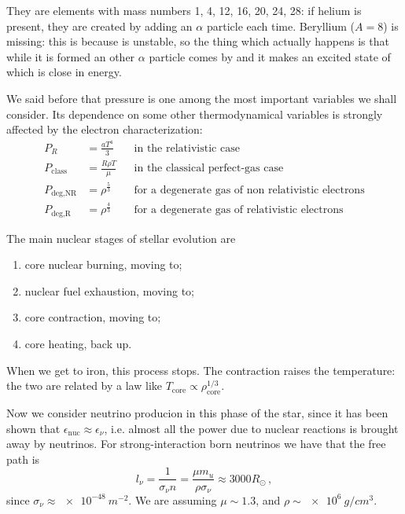 \documentclass[main.tex]{subfiles}
\begin{document}
\begin{bluebox}
They are elements with mass numbers 1, 4, 12, 16, 20, 24, 28: if helium is present, they are created by adding an \(\alpha \) particle each time. Beryllium (\(A = 8\)) is missing: this is because  is unstable, so the thing which actually happens is that while it is formed an other \(\alpha \) particle comes by and it makes an excited state of  which is close in energy.
\end{bluebox}
    
We said before that pressure is one among the most important variables we shall consider. Its dependence on some other thermodynamical variables is strongly affected by the electron characterization:
%
\begin{subequations}
\begin{align}
P_R &=\frac{aT^4}{3} && \text{in the relativistic case}\\
P_{\text{class}} &=\frac{R\rho T}{\mu} && \text{in the classical perfect-gas case}\\
P_{\text{deg,NR}} &=\rho^{\frac{5}{3}} && \text{for a degenerate gas of non relativistic electrons} \\
P_{\text{deg,R}} &=\rho^{\frac{4}{3}} && \text{for a degenerate gas of relativistic electrons}
\end{align}
\end{subequations}

The main nuclear stages of stellar evolution are 
\begin{enumerate}
    \item core nuclear burning, moving to;
    \item nuclear fuel exhaustion, moving to;
    \item core contraction, moving to;
    \item core heating, back up.
\end{enumerate}

When we get to iron, this process stops.
The contraction raises the temperature: the two are related by a law like \(T _{\text{core}} \propto \rho _{\text{core}}^{1/3}\). 

Now we consider neutrino producion in this phase of the star, since it has been shown that $\epsilon_{\text{nuc}}\approx \epsilon_\nu$, i.e. almost all the power due to nuclear reactions is brought away by neutrinos.
For strong-interaction born neutrinos we have that the free path is
%
\begin{equation}
    l_\nu=\frac{1}{\sigma_\nu n}=\frac{\mu m_u}{\rho\sigma_\nu}\approx 3000 R_{\odot}\,,
\end{equation}
%
since \(\sigma_{\nu } \approx \SI{e-48}{m^{-2}}\).
We are assuming \(\mu \sim 1.3\), and \(\rho \sim \SI{e6}{g/cm^3}\).
\end{document}
